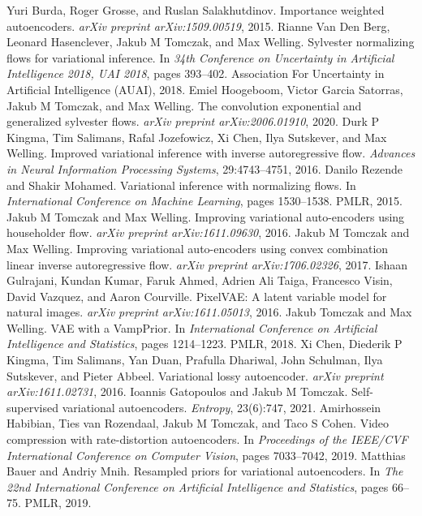 \begin{chapterreferences}
 Yuri Burda, Roger Grosse, and Ruslan Salakhutdinov. Importance weighted autoencoders. \textit{arXiv preprint arXiv:1509.00519}, 2015.
 Rianne Van Den Berg, Leonard Hasenclever, Jakub M Tomczak, and Max Welling. Sylvester normalizing flows for variational inference. In \textit{34th Conference on Uncertainty in Artificial Intelligence 2018, UAI 2018}, pages 393–402. Association For Uncertainty in Artificial Intelligence (AUAI), 2018.
 Emiel Hoogeboom, Victor Garcia Satorras, Jakub M Tomczak, and Max Welling. The convolution exponential and generalized sylvester flows. \textit{arXiv preprint arXiv:2006.01910}, 2020.
 Durk P Kingma, Tim Salimans, Rafal Jozefowicz, Xi Chen, Ilya Sutskever, and Max Welling. Improved variational inference with inverse autoregressive flow. \textit{Advances in Neural Information Processing Systems}, 29:4743–4751, 2016.
 Danilo Rezende and Shakir Mohamed. Variational inference with normalizing flows. In \textit{International Conference on Machine Learning}, pages 1530–1538. PMLR, 2015.
 Jakub M Tomczak and Max Welling. Improving variational auto-encoders using householder flow. \textit{arXiv preprint arXiv:1611.09630}, 2016.
 Jakub M Tomczak and Max Welling. Improving variational auto-encoders using convex combination linear inverse autoregressive flow. \textit{arXiv preprint arXiv:1706.02326}, 2017.
 Ishaan Gulrajani, Kundan Kumar, Faruk Ahmed, Adrien Ali Taiga, Francesco Visin, David Vazquez, and Aaron Courville. PixelVAE: A latent variable model for natural images. \textit{arXiv preprint arXiv:1611.05013}, 2016.
 Jakub Tomczak and Max Welling. VAE with a VampPrior. In \textit{International Conference on Artificial Intelligence and Statistics}, pages 1214–1223. PMLR, 2018.
 Xi Chen, Diederik P Kingma, Tim Salimans, Yan Duan, Prafulla Dhariwal, John Schulman, Ilya Sutskever, and Pieter Abbeel. Variational lossy autoencoder. \textit{arXiv preprint arXiv:1611.02731}, 2016.
 Ioannis Gatopoulos and Jakub M Tomczak. Self-supervised variational autoencoders. \textit{Entropy}, 23(6):747, 2021.
 Amirhossein Habibian, Ties van Rozendaal, Jakub M Tomczak, and Taco S Cohen. Video compression with rate-distortion autoencoders. In \textit{Proceedings of the IEEE/CVF International Conference on Computer Vision}, pages 7033–7042, 2019.
 Matthias Bauer and Andriy Mnih. Resampled priors for variational autoencoders. In \textit{The 22nd International Conference on Artificial Intelligence and Statistics}, pages 66–75. PMLR, 2019.

\end{chapterreferences}
